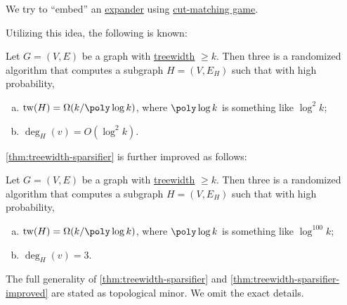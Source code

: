 \begin{intuition}
	We try to ``embed'' an \hyperref[def:expander]{expander} using \hyperref[def:cut-matching-game]{cut-matching game}.
\end{intuition}

Utilizing this idea, the following is known:

\begin{theorem}\label{thm:treewidth-sparsifier}
	Let \(G = (V, E)\) be a graph with \hyperref[def:treewidth]{treewidth} \(\geq k\). Then three is a randomized algorithm that computes a subgraph \(H = (V, E_H)\) such that with high probability,
	\begin{enumerate}[(a)]
		\item \(\operatorname{tw}(H) = \Omega (k / \poly \log k)\), where \(\poly \log k\) is something like \(\log ^2 k\);
		\item \(\deg_H(v) = O(\log ^2 k)\).
	\end{enumerate}
\end{theorem}

\autoref{thm:treewidth-sparsifier} is further improved as follows:

\begin{theorem}\label{thm:treewidth-sparsifier-improved}
	Let \(G = (V, E)\) be a graph with \hyperref[def:treewidth]{treewidth} \(\geq k\). Then three is a randomized algorithm that computes a subgraph \(H = (V, E_H)\) such that with high probability,
	\begin{enumerate}[(a)]
		\item \(\operatorname{tw}(H) = \Omega (k / \poly \log k)\), where \(\poly \log k\) is something like \(\log ^{100} k\);
		\item \(\deg_H(v) = 3\).
	\end{enumerate}
\end{theorem}

\begin{remark}
	The full generality of \autoref{thm:treewidth-sparsifier} and \autoref{thm:treewidth-sparsifier-improved} are stated as topological minor. We omit the exact details.
\end{remark}

